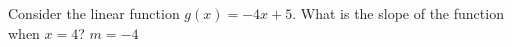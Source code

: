 {Consider the linear function $g(x)=-4x+5$. What is the slope of the function when $x=4$?}
{$m=-4$}
